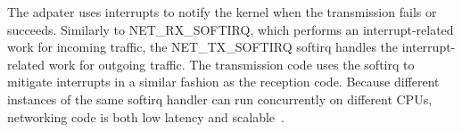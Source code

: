 The adpater uses interrupts to notify the kernel when the transmission fails or succeeds.
Similarly to NET\_RX\_SOFTIRQ, which performs an interrupt-related work for incoming traffic,
the NET\_TX\_SOFTIRQ softirq handles the interrupt-related work for outgoing traffic.
The transmission code uses the softirq to mitigate interrupts in a similar fashion as the reception code.
Because different instances of the same softirq handler can run concurrently on different CPUs,
networking code is both low latency and scalable~\cite{understanding-internals}.


